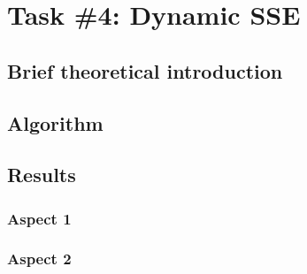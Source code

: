 \section*{Task \#4: Dynamic SSE}

\subsection*{Brief theoretical introduction}

\subsection*{Algorithm}

\subsection*{Results}


\subsubsection*{Aspect 1}

\subsubsection*{Aspect 2}
